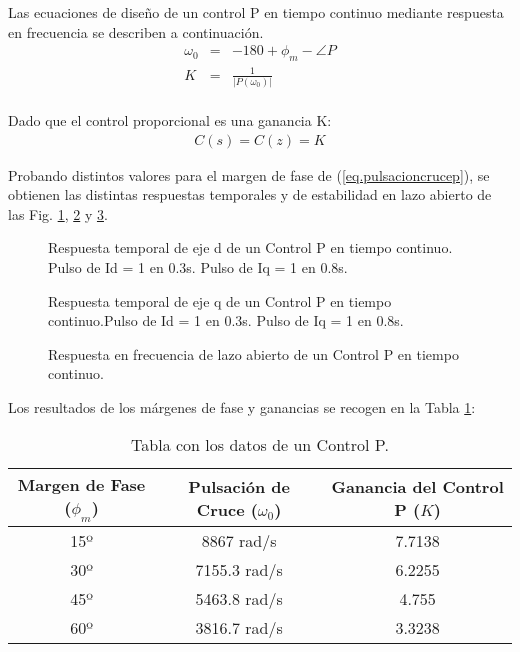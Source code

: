 \documentclass{report}
\begin{document}
Las ecuaciones de diseño de un control P en tiempo continuo mediante respuesta en frecuencia se describen a continuación.
\begin{eqnarray}
    \omega_{0} &=& -180  + \phi_{m} - \angle P\\ \label{eq.pulsacioncrucep}
    K &=& \frac{1}{\left\lvert P (\omega_{0})\right\rvert }\\
\end{eqnarray}

Dado que el control proporcional es una ganancia K:
\begin{eqnarray}
    C(s) = C(z) = K
\end{eqnarray}


Probando distintos valores para el margen de fase de (\ref{eq.pulsacioncrucep}), se obtienen las distintas respuestas temporales y de estabilidad en lazo abierto de las Fig. \ref{fig.resptempPid}, \ref{fig.resptempPiq} y \ref{fig.repestabilidadP}.

\begin{figure}[!h]
    \centering
    \caption{Respuesta temporal de eje d de un Control P en tiempo continuo. Pulso de Id = 1 en 0.3s. Pulso de Iq = 1 en 0.8s.}
    \label{fig.resptempPid}
\end{figure} 

\begin{figure}[!h]
    \centering
    \caption{Respuesta temporal de eje q de un Control P en tiempo continuo.Pulso de Id = 1 en 0.3s. Pulso de Iq = 1 en 0.8s.}
    \label{fig.resptempPiq}
\end{figure} 

\begin{figure}[!h]
    \centering
    \caption{Respuesta en frecuencia de lazo abierto de un Control P en tiempo continuo.}
    \label{fig.repestabilidadP}
\end{figure} 
Los resultados de los márgenes de fase y ganancias se recogen en la Tabla \ref{tab.datoscontrolP}:

\begin{table}[!h]
    \begin{center}
    \begin{tabular}{|c|c|c|} \hline\hline\hline
        \textbf{Margen de Fase} ($\phi_{m}$) & \textbf{Pulsación de Cruce ($\omega_{0}$)} & \textbf{Ganancia del Control P ($K$)} \\ \hline
    15º & 8867 rad/s & 7.7138\\ \hline
    30º & 7155.3 rad/s & 6.2255\\ \hline   
    45º & 5463.8 rad/s & 4.755\\ \hline
    60º & 3816.7 rad/s & 3.3238\\ \hline 

    \end{tabular}
    \end{center}
    \caption{Tabla con los datos de un Control P.} \label{tab.datoscontrolP}
    \end{table}
    
\end{document}
